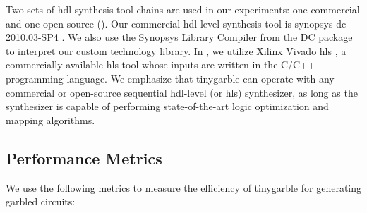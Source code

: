 Two sets of \acrshort{hdl} synthesis tool chains are used in our experiments: one commercial and one open-source ().
Our commercial \acrshort{hdl} level synthesis tool is \gls{synopsys-dc} 2010.03-SP4 \cite{tool:DesignCompiler}.
We also use the Synopsys Library Compiler from the DC package to interpret our custom technology library.
In , we utilize Xilinx Vivado \acrshort{hls} \cite{tool:Vivado}, a commercially available \acrshort{hls} tool whose inputs are written in the C/C++ programming language.
We emphasize that \gls{tinygarble} can operate with any commercial or open-source sequential \acrshort{hdl}-level (or \acrshort{hls}) synthesizer, as long as the synthesizer is capable of performing state-of-the-art logic optimization and mapping algorithms.

\subsection{Performance Metrics}\label{ssec:eval-tinygarble-metric}
We use the following metrics to measure the efficiency of \gls{tinygarble} for generating garbled circuits:

